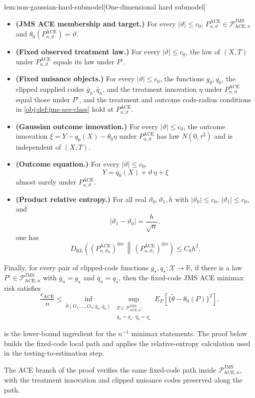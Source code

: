 \begin{lemmav}{lem:non-gaussian-hard-submodel}[One-dimensional hard submodel]
\begin{itemize}
\item \textbf{(JMS ACE membership and target.)} For every \(|\vartheta|\le c_0\), \(P_{n,\vartheta}^{\mathrm{ACE}}\in\mathcal P_{\mathrm{ACE},n}^{\mathrm{JMS}}\) and \(\theta_0(P_{n,\vartheta}^{\mathrm{ACE}})=\vartheta\).
\item \textbf{(Fixed observed treatment law.)} For every \(|\vartheta|\le c_0\), the law of \((X,T)\) under \(P_{n,\vartheta}^{\mathrm{ACE}}\) equals its law under \(P^{\circ}\).
\item \textbf{(Fixed nuisance objects.)} For every \(|\vartheta|\le c_0\), the functions \(g_0,q_0\), the clipped supplied codes \(\bar g_n,\bar q_n\), and the treatment innovation \(\eta\) under \(P_{n,\vartheta}^{\mathrm{ACE}}\) equal those under \(P^{\circ}\), and the treatment and outcome code-radius conditions in \cref{obj:def:jms-ace-class} hold at \(P_{n,\vartheta}^{\mathrm{ACE}}\).
\item \textbf{(Gaussian outcome innovation.)} For every \(|\vartheta|\le c_0\), the outcome innovation \(\xi=Y-q_0(X)-\theta_0\eta\) under \(P_{n,\vartheta}^{\mathrm{ACE}}\) has law \(N(0,\tau^2)\) and is independent of \((X,T)\).
\item \textbf{(Outcome equation.)} For every \(|\vartheta|\le c_0\),
\[
Y=q_0(X)+\vartheta\,\eta+\xi
\]
almost surely under \(P_{n,\vartheta}^{\mathrm{ACE}}\).
\item \textbf{(Product relative entropy.)} For all real \(\vartheta_0,\vartheta_1,h\) with \(|\vartheta_0|\le c_0\), \(|\vartheta_1|\le c_0\), and
\[
|\vartheta_1-\vartheta_0|=\frac{h}{\sqrt n},
\]
one has
\[
D_{\mathrm{KL}}\!\left((P_{n,\vartheta_0}^{\mathrm{ACE}})^{\otimes n}\,\middle\|\,(P_{n,\vartheta_1}^{\mathrm{ACE}})^{\otimes n}\right)
\le C_0 h^2 .
\]
\end{itemize}
Finally, for every pair of clipped-code functions \(g_{\star},q_{\star}:\mathcal X\to\mathbb R\), if there is a law \(P^{\circ}\in\mathcal P_{\mathrm{ACE},n}^{\mathrm{JMS}}\) with \(\bar g_n=g_{\star}\) and \(\bar q_n=q_{\star}\), then the fixed-code JMS ACE minimax risk satisfies
\[
\frac{c_{\mathrm{ACE}}}{n}
\le
\inf_{\widetilde\theta(O_1,\ldots,O_n;\bar g_n,\bar q_n)}
\sup_{\substack{P\in\mathcal P_{\mathrm{ACE},n}^{\mathrm{JMS}}:\\ \bar g_n=g_{\star},\ \bar q_n=q_{\star}}}
E_P\!\left[\{\widetilde\theta-\theta_0(P)\}^2\right].
\]
\end{lemmav}

 is the lower-bound ingredient for the \(n^{-1}\) minimax statements. The proof below builds the fixed-code local path and applies the relative-entropy calculation used in the testing-to-estimation step.

The ACE branch of the proof verifies the same fixed-code path inside \(\mathcal P_{\mathrm{ACE},n}^{\mathrm{JMS}}\), with the treatment innovation and clipped nuisance codes preserved along the path.
